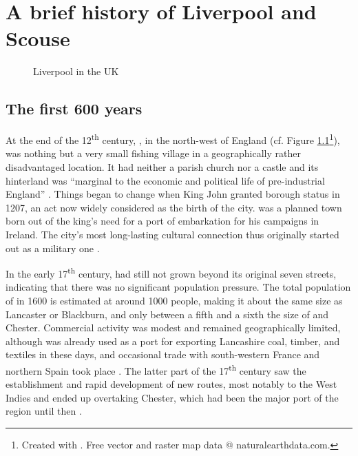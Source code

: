 \chapter{A brief history of Liverpool and Scouse}\label{ch.hist}

	\begin{figure}[h]
		\centering
		\caption{Liverpool in the UK}
		\label{fig.ex}
	\end{figure}

	\section{The first 600 years}\label{sec.hist.early}

At the end of the 12\textsuperscript{th} century, , in the north-west of England (cf. Figure \ref{fig.ex}\footnote{Created with \cite{QGIS2016}. Free vector and raster map data @ naturalearthdata.com.}), was nothing but a very small fishing village in a geographically rather disadvantaged location.
It had neither a parish church nor a castle and its hinterland was ``marginal to the economic and political life of pre-industrial England'' \citep[59]{kermodeetal2006}.
Things began to change when King John granted  borough status in 1207, an act now widely considered as the birth of the city. 
 was a planned town born out of the king's need for a port of embarkation for his campaigns in Ireland.
The city's most long-lasting cultural connection thus originally started out as a military one \citeyearpar[cf.][59--63]{kermodeetal2006}.

In the early 17\textsuperscript{th} century,  had still not grown beyond its original seven streets, indicating that there was no significant population pressure.
The total population of  in 1600 is estimated at around 1000 people, making it about the same size as Lancaster or Blackburn, and only between a fifth and a sixth the size of  and Chester.
Commercial activity was modest and remained geographically limited, although  was already used as a port for exporting Lancashire coal, timber, and textiles in these days, and occasional trade with south-western France and northern Spain took place \citeyearpar[cf.][72--76 and 81--84]{kermodeetal2006}.
The latter part of the 17\textsuperscript{th} century saw the establishment and rapid development of new routes, most notably to the West Indies and  ended up overtaking Chester, which had been the major port of the region until then \citep[cf.][107--110]{kermodeetal2006}.

